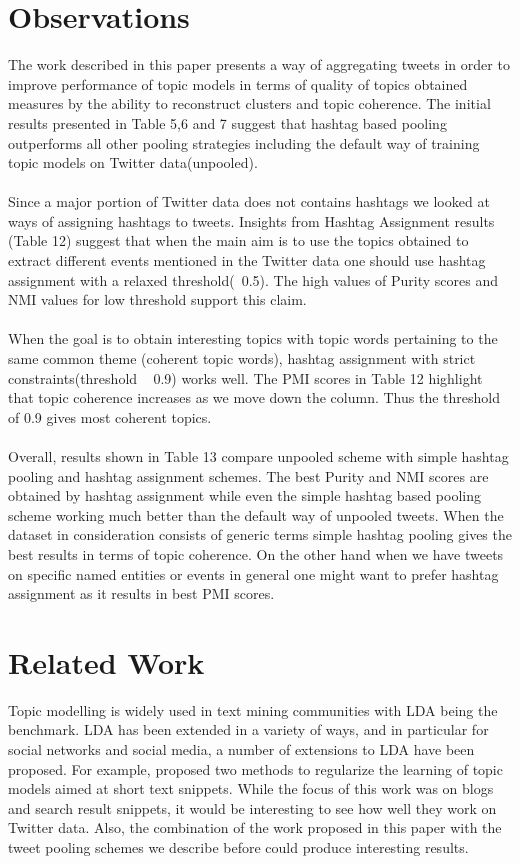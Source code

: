 \documentclass[10pt,a5paper,twoside]{article}
\begin{document}
\section{Observations}
The work described in this paper presents a way of aggregating tweets in order to improve performance of topic models in terms of quality of topics obtained  measures by the ability to reconstruct clusters and topic coherence. The initial results presented in Table 5,6 and 7 suggest that hashtag based pooling outperforms all other pooling strategies including the default way of training topic models on Twitter data(unpooled).
\\\\
Since a major portion of Twitter data does not contains hashtags we looked at ways of assigning hashtags to tweets. Insights from Hashtag Assignment results (Table 12) suggest that when the main aim is to use the topics obtained to extract different events mentioned in the Twitter data one should use hashtag assignment with a relaxed threshold(~0.5). The high values of Purity scores and NMI values for low threshold support this claim.
\\\\
When the goal is to obtain interesting topics with topic words pertaining to the same common theme (coherent topic words), hashtag assignment with strict constraints(threshold ~ 0.9) works well. The PMI scores in Table 12 highlight that topic coherence increases as we move down the column. Thus the threshold of 0.9 gives most coherent topics.
\\\\
Overall, results shown in Table 13 compare unpooled scheme with simple hashtag pooling and hashtag assignment schemes. The best Purity and NMI scores are obtained by hashtag assignment while even the simple hashtag based pooling scheme working much better than the default way of unpooled tweets. When the dataset in consideration consists of generic terms simple hashtag pooling gives the best results in terms of topic coherence. On the other hand when we have tweets on specific named entities or events in general one might want to prefer hashtag assignment as it results in best PMI scores. 
\\


\section{Related Work}
Topic modelling is widely used in text mining communities with LDA
being the benchmark.  LDA has been extended in a variety of ways, and
in particular for social networks and social media, a number of
extensions to LDA have been proposed.  For example, \cite{newman11} proposed
two methods to regularize the learning of topic models aimed at short
text snippets. While the focus of this work was on blogs and search
result snippets, it would be interesting to see how well they work on
Twitter data. Also, the combination of the work proposed in this paper
with the tweet pooling schemes we describe before could produce
interesting results.
\end{document}
